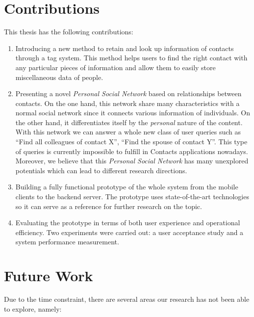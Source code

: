 \section{Contributions}
This thesis has the following contributions:

\begin{enumerate}
    \item Introducing a new method to retain and look up information of contacts through a tag system. This method helps users to find the right contact with any particular pieces of information and allow them to easily store miscellaneous data of people.
    \item Presenting a novel \textit{Personal Social Network} based on relationships between contacts. On the one hand, this network share many characteristics with a normal social network since it connects various information of individuals. On the other hand, it differentiates itself by the \textit{personal} nature of the content. With this network we can answer a whole new class of user queries such as ``Find all colleagues of contact X'', ``Find the spouse of contact Y''. This type of queries is currently impossible to fulfill in Contacts applications nowadays. Moreover, we believe that this \textit{Personal Social Network} has many unexplored potentials which can lead to different research directions.
    \item Building a fully functional prototype of the whole system from the mobile clients to the backend server. The prototype uses state-of-the-art technologies so it can serve as a reference for further research on the topic.
    \item Evaluating the prototype in terms of both user experience and operational efficiency. Two experiments were carried out: a user acceptance study and a system performance measurement.
\end{enumerate}

\section{Future Work}
Due to the time constraint, there are several areas our research has not been able to explore, namely:

